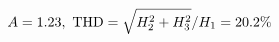 \documentclass[preview]{standalone}
\begin{document}
\begin{align*}
\special{dvisvgm:raw <g id='unique000'>}A=1.23,\ \text{THD}=\sqrt{H_2^2+H_3^2}/H_1=20.2\%\special{dvisvgm:raw </g>}
\end{align*}
\end{document}

